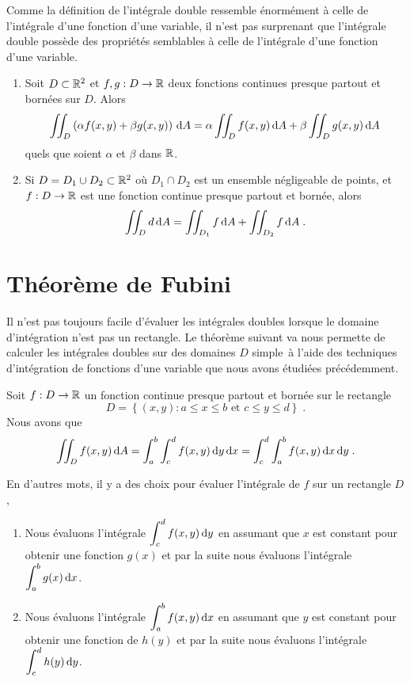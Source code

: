 {Comme la définition de l'intégrale double ressemble énormément à celle de
l'intégrale d'une fonction d'une variable, il n'est pas surprenant que
l'intégrale double possède des propriétés semblables à celle de l'intégrale
d'une fonction d'une variable.

\begin{focus}{\prp}
\begin{enumerate}
\item Soit $D\subset \mathbb{R}^2$ et $f,g:D \rightarrow \mathbb{R}$ deux fonctions
continues presque partout et bornées sur $D$.  Alors
\[
\iint_D \left( \alpha f(x,y) + \beta g(x,y) \right) \,\mathrm{d}A =
\alpha \iint_D f(x,y) \,\mathrm{d}A + \beta \iint_D g(x,y) \,\mathrm{d}A
\]
quels que soient $\alpha$ et $\beta$ dans $\mathbb{R}$.
\item Si $D = D_1 \cup D_2 \subset \mathbb{R}^2$ où $D_1 \cap D_2$ est un
ensemble négligeable de points\footnotemark, et $f:D\rightarrow \mathbb{R}$
est une fonction continue presque partout et bornée, alors
\[
\iint_D d \,\mathrm{d}A = \iint_{D_1} f \,\mathrm{d}A + \iint_{D_2} f \,\mathrm{d}A \; .
\]
\end{enumerate}
\end{focus}


\section{Théorème de Fubini}

Il n'est pas toujours facile d'évaluer les intégrales doubles lorsque le
domaine d'intégra\-tion n'est pas un rectangle.  Le théorème suivant va nous
permette de calculer les intégrales doubles sur des domaines $D$ \flqq
simple\frqq\ à l'aide des techniques d'intégration de fonctions d'une
variable que nous avons étudiées précédemment.

\begin{focus}{\thm}
Soit $f:D\rightarrow \mathbb{R}$ un fonction continue presque partout et
bornée sur le rectangle
\[
D=\left\{(x,y): a\leq x \leq b \text{ et } c\leq y \leq d \right\}
\; .
\]
Nous avons que
\[
\iint_D f(x,y) \,\mathrm{d}A = \int_a^b \int_c^d f(x,y) \,\mathrm{d}y \,\mathrm{d}x
= \int_c^d \int_a^b f(x,y) \,\mathrm{d}x \,\mathrm{d}y \; .
\]
\end{focus}

En d'autres mots, il y a des choix pour évaluer l'intégrale de $f$ sur
un rectangle $D$,
\begin{enumerate}
\item Nous évaluons l'intégrale $\displaystyle \int_c^d f(x,y) \,\mathrm{d}y$ en
assumant que $x$ est constant pour obtenir une fonction $g(x)$ et par la
suite nous évaluons l'intégrale $\displaystyle \int_a^b g(x) \,\mathrm{d}x$.
\item Nous évaluons l'intégrale $\displaystyle \int_a^b f(x,y) \,\mathrm{d}x$ en
assumant que $y$ est constant pour obtenir une fonction de $h(y)$ et par la
suite nous évaluons l'intégrale $\displaystyle \int_c^d h(y) \,\mathrm{d}y$.
\end{enumerate}

}
